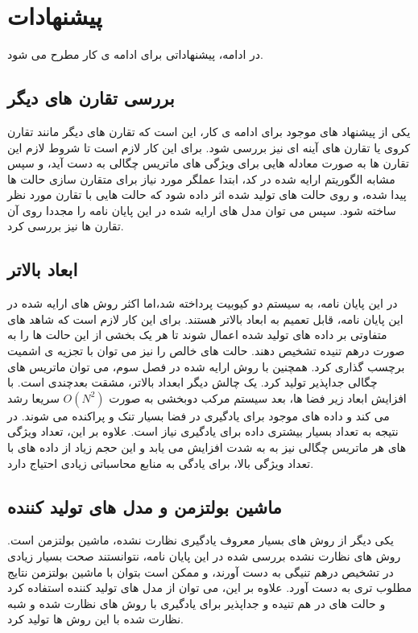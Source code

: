 \section{پیشنهادات}

در ادامه، پیشنهاداتی برای ادامه ی کار مطرح می شود.
\subsection{بررسی تقارن های دیگر}
یکی از پیشنهاد های موجود برای ادامه ی کار، این است که تقارن های دیگر مانند تقارن کروی یا تقارن های آینه ای نیز بررسی شود. برای این کار لازم است تا شروط لازم این تقارن ها به صورت معادله هایی برای ویژگی های ماتریس چگالی به دست آید، و سپس مشابه الگوریتم ارایه شده در کد، ابتدا عملگر مورد نیاز برای متقارن سازی حالت ها پیدا شده، و روی حالت های تولید شده اثر داده شود که حالت هایی با تقارن مورد نظر ساخته شود. سپس می توان مدل های ارایه شده در این پایان نامه را مجددا روی آن تقارن ها نیز بررسی کرد.
\subsection{ابعاد بالاتر}
در این پایان نامه، به سیستم دو کیوبیت پرداخته شد،‌اما اکثر روش های ارایه شده در این پایان نامه، قابل تعمیم به ابعاد بالاتر هستند. برای این کار لازم است که شاهد های متفاوتی بر داده های تولید شده اعمال شوند تا هر یک بخشی از این حالت ها را به صورت درهم تنیده تشخیص دهند. حالت های خالص را نیز می توان با تجزیه ی اشمیت برچسب گذاری کرد. همچنین با روش ارایه شده در فصل سوم، می توان ماتریس های چگالی جداپذیر تولید کرد. یک چالش دیگر ابعداد بالاتر، مشقت بعدچندی
است. با افزایش ابعاد زیر فضا ها، بعد سیستم مرکب دوبخشی به صورت
$O(N^2)$
سریعا رشد می کند و داده های موجود برای یادگیری در فضا بسیار تنک و پراکنده می شوند. در نتیجه به تعداد بسیار بیشتری داده برای یادگیری نیاز است. علاوه بر این، تعداد ویژگی های هر ماتریس چگالی نیز به
به شدت افزایش می یابد و این حجم زیاد از داده های با تعداد ویژگی بالا، برای یادگی به منابع محاسباتی زیادی احتیاج دارد.
\subsection{ماشین بولتزمن و مدل های تولید کننده}
یکی دیگر از روش های بسیار معروف یادگیری نظارت نشده، ماشین بولتزمن است. روش های نظارت نشده بررسی شده در این پایان نامه، نتوانستند صحت بسیار زیادی در تشخیص درهم تنیگی به دست آورند، و ممکن است بتوان با ماشین بولتزمن نتایج مطلوب تری به دست آورد. علاوه بر این، می توان از مدل های تولید کننده
استفاده کرد و حالت های در هم تنیده و جداپذیر برای یادگیری با روش های نظارت شده و شبه نظارت شده با این روش ها تولید کرد.‌
